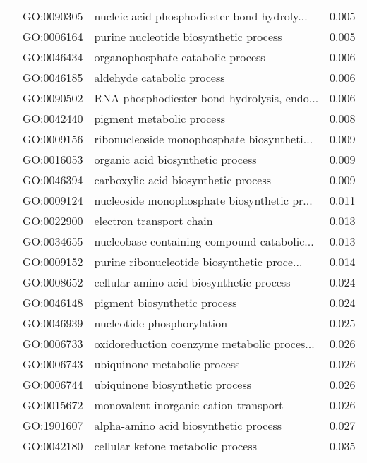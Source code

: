 \begin{longtable}{lllr}
   & GO:0090305 &  nucleic acid phosphodiester bond hydroly... &         0.005 \\
   & GO:0006164 &       purine nucleotide biosynthetic process &         0.005 \\
   & GO:0046434 &            organophosphate catabolic process &         0.006 \\
   & GO:0046185 &                   aldehyde catabolic process &         0.006 \\
   & GO:0090502 &  RNA phosphodiester bond hydrolysis, endo... &         0.006 \\
   & GO:0042440 &                    pigment metabolic process &         0.008 \\
   & GO:0009156 &  ribonucleoside monophosphate biosyntheti... &         0.009 \\
   & GO:0016053 &            organic acid biosynthetic process &         0.009 \\
   & GO:0046394 &         carboxylic acid biosynthetic process &         0.009 \\
   & GO:0009124 &  nucleoside monophosphate biosynthetic pr... &         0.011 \\
   & GO:0022900 &                     electron transport chain &         0.013 \\
   & GO:0034655 &  nucleobase-containing compound catabolic... &         0.013 \\
   & GO:0009152 &  purine ribonucleotide biosynthetic proce... &         0.014 \\
   & GO:0008652 &     cellular amino acid biosynthetic process &         0.024 \\
   & GO:0046148 &                 pigment biosynthetic process &         0.024 \\
   & GO:0046939 &                   nucleotide phosphorylation &         0.025 \\
   & GO:0006733 &  oxidoreduction coenzyme metabolic proces... &         0.026 \\
   & GO:0006743 &                 ubiquinone metabolic process &         0.026 \\
   & GO:0006744 &              ubiquinone biosynthetic process &         0.026 \\
   & GO:0015672 &        monovalent inorganic cation transport &         0.026 \\
   & GO:1901607 &        alpha-amino acid biosynthetic process &         0.027 \\
   & GO:0042180 &            cellular ketone metabolic process &         0.035 \\

\end{longtable}
